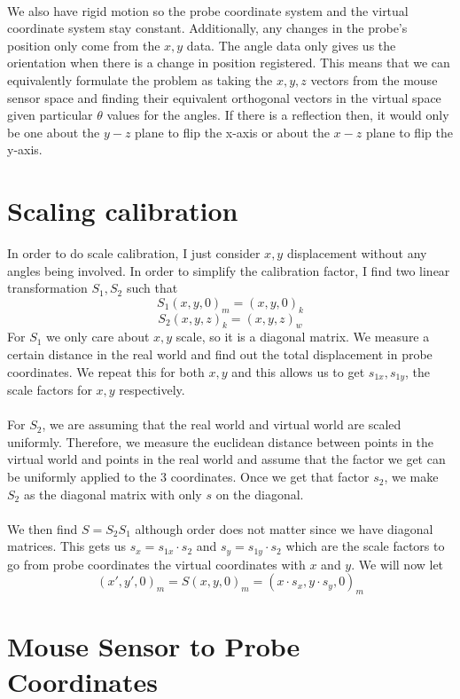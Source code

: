 \documentclass[conference]{acmsiggraph}
\begin{document}
\\
We also have rigid motion so the probe coordinate system and the virtual coordinate system stay constant. Additionally, any changes in the probe's position only come from the $x,y$ data. The angle data only gives us the orientation when there is a change in position registered. This means that we can equivalently formulate the problem as taking the $x,y,z$ vectors from the mouse sensor space and finding their equivalent orthogonal vectors in the virtual space given particular $\theta$ values for the angles. If there is a reflection then, it would only be one about the $y-z$ plane to flip the x-axis or about the $x-z$ plane to flip the y-axis. 

\section{Scaling calibration}

In order to do scale calibration, I just consider $x,y$ displacement without any angles being involved. In order to simplify the calibration factor, I find two linear transformation $S_1,S_2$ such that 
\[
S_1(x,y,0)_m = (x,y,0)_k
\]
\[
S_2(x,y,z)_k = (x,y,z)_w
\]
For $S_1$ we only care about $x,y$ scale, so it is a diagonal matrix. We measure a certain distance in the real world and find out the total displacement in probe coordinates. We repeat this for both $x,y$ and this allows us to get $s_{1x},s_{1y}$, the scale factors for $x,y$ respectively. \\
\\
For $S_2$, we are assuming that the real world and virtual world are scaled uniformly. Therefore, we measure the euclidean distance between points in the virtual world and points in the real world and assume that the factor we get can be uniformly applied to the 3 coordinates. Once we get that factor $s_2$, we make $S_2$ as the diagonal matrix with only $s$ on the diagonal. \\
\\
We then find $S=S_2S_1$ although order does not matter since we have diagonal matrices. This gets us $s_x=s_{1x} \cdot s_2$ and $s_y=s_{1y} \cdot s_2$ which are the scale factors to go from probe coordinates the virtual coordinates with $x$ and $y$. We will now let
\[
(x',y',0)_m = S(x,y,0)_m = (x \cdot s_x, y \cdot s_y, 0)_m
\]

\section{Mouse Sensor to Probe Coordinates}
\end{document}
